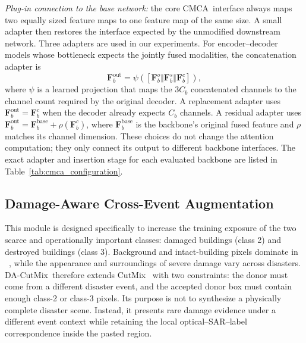 \documentclass[journal]{IEEEtran}
\newcommand{\cmca}{CMCA}
\newcommand{\dacutmix}{DA-CutMix}
\begin{document}
    \emph{Plug-in connection to the base network:} the core \cmca\ interface always maps two equally sized feature maps to one feature map of the same size. A small adapter then restores the interface expected by the unmodified downstream network. Three adapters are used in our experiments. For encoder--decoder models whose bottleneck expects the jointly fused modalities, the concatenation adapter is
    \begin{equation}
        \mathbf{F}^{\mathrm{out}}_{b}
        =\psi\!\left(
        [\mathbf{F}^{o}_{b}\Vert
         \mathbf{F}^{s}_{b}\Vert
         \mathbf{F}^{c}_{b}]
        \right),
        \label{eq:cmca_concat_adapter}
    \end{equation}
    where $\psi$ is a learned projection that maps the $3C_b$ concatenated channels to the channel count required by the original decoder. A replacement adapter uses $\mathbf{F}^{\mathrm{out}}_{b}=\mathbf{F}^{c}_{b}$ when the decoder already expects $C_b$ channels. A residual adapter uses $\mathbf{F}^{\mathrm{out}}_{b}=\mathbf{F}^{\mathrm{base}}_{b}+\rho(\mathbf{F}^{c}_{b})$, where $\mathbf{F}^{\mathrm{base}}_{b}$ is the backbone's original fused feature and $\rho$ matches its channel dimension. These choices do not change the attention computation; they only connect its output to different backbone interfaces. The exact adapter and insertion stage for each evaluated backbone are listed in Table~\ref{tab:cmca_configuration}.
    
    
    \subsection{Damage-Aware Cross-Event Augmentation}
    \label{subsec:dacutmix}
    
    This module is designed specifically to increase the training exposure of the two scarce and operationally important classes: damaged buildings (class 2) and destroyed buildings (class 3). Background and intact-building pixels dominate in ~\cite{chen2025bright}, while the appearance and surroundings of severe damage vary across disasters. \dacutmix\ therefore extends CutMix~\cite{yun2019cutmix} with two constraints: the donor must come from a different disaster event, and the accepted donor box must contain enough class-2 or class-3 pixels. Its purpose is not to synthesize a physically complete disaster scene. Instead, it presents rare damage evidence under a different event context while retaining the local optical--SAR--label correspondence inside the pasted region.
    
\end{document}
